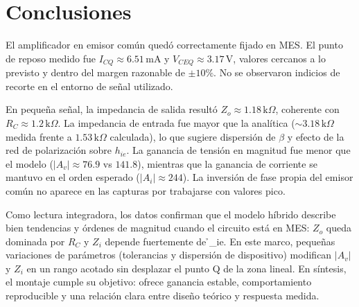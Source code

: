 \chapter{Conclusiones}
El amplificador en emisor común quedó correctamente fijado en MES. El punto de reposo medido fue \(I_{CQ}\approx 6.51\,
\mathrm{mA}\) y \(V_{CEQ}\approx 3.17\,\mathrm{V}\), valores cercanos a lo previsto y dentro del margen razonable de
\(\pm10\%\). No se observaron indicios de recorte en el entorno de señal utilizado.

En pequeña señal, la impedancia de salida resultó \(Z_o\approx 1.18\,\mathrm{k}\Omega\), coherente con \(R_C\approx
1.2\,\mathrm{k}\Omega\). La impedancia de entrada fue mayor que la analítica (\(\sim 3.18\,\mathrm{k}\Omega\) medida
frente a \(1.53\,\mathrm{k}\Omega\) calculada), lo que sugiere dispersión de \(\beta\) y efecto de la red de
polarización sobre \(h_{ie}\). La ganancia de tensión en magnitud fue menor que el modelo (\(|A_v|\approx 76.9\) vs
\(141.8\)), mientras que la ganancia de corriente se mantuvo en el orden esperado (\(|A_i|\approx 244\)). La inversión
de fase propia del emisor común no aparece en las capturas por trabajarse con valores pico.

Como lectura integradora, los datos confirman que el modelo híbrido describe bien tendencias y órdenes de magnitud 
cuando el circuito está en MES: \(Z_o\) queda dominada por \(R_C\) y \(Z_i\) 
depende fuertemente de \h_{ie}\). En este marco, pequeñas variaciones de parámetros (tolerancias y dispersión de 
dispositivo) modifican \(|A_v|\) y \(Z_i\) en un rango acotado sin desplazar el punto Q de la zona lineal. En síntesis, 
el montaje cumple su objetivo: ofrece ganancia estable, comportamiento reproducible y una relación 
clara entre diseño teórico y respuesta medida.
